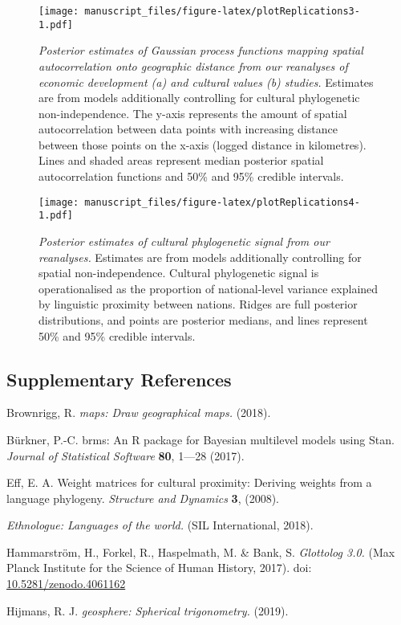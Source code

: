\documentclass[english,man,floatsintext]{apa6}
\begin{document}
\newpage



\begin{figure}
\centering
\texttt{[image: manuscript\_files/figure-latex/plotReplications3-1.pdf]}
\caption{\label{fig:plotReplications3}\emph{Posterior estimates of Gaussian process functions mapping spatial autocorrelation onto geographic distance from our reanalyses of economic development (a) and cultural values (b) studies.} Estimates are from models additionally controlling for cultural phylogenetic non-independence. The y-axis represents the amount of spatial autocorrelation between data points with increasing distance between those points on the x-axis (logged distance in kilometres). Lines and shaded areas represent median posterior spatial autocorrelation functions and 50\% and 95\% credible intervals.}
\end{figure}

\newpage



\begin{figure}
\centering
\texttt{[image: manuscript\_files/figure-latex/plotReplications4-1.pdf]}
\caption{\label{fig:plotReplications4}\emph{Posterior estimates of cultural phylogenetic signal from our reanalyses.} Estimates are from models additionally controlling for spatial non-independence. Cultural phylogenetic signal is operationalised as the proportion of national-level variance explained by linguistic proximity between nations. Ridges are full posterior distributions, and points are posterior medians, and lines represent 50\% and 95\% credible intervals.}
\end{figure}

\newpage

\hypertarget{supplementary-references}{%
\subsection{Supplementary References}\label{supplementary-references}}

Brownrigg, R. \emph{maps: Draw geographical maps.} (2018).

Bürkner, P.-C. brms: An R package for Bayesian multilevel models using Stan. \emph{Journal of Statistical Software} \textbf{80}, 1---28 (2017).

Eff, E. A. Weight matrices for cultural proximity: Deriving weights from a language phylogeny. \emph{Structure and Dynamics} \textbf{3}, (2008).

\emph{Ethnologue: Languages of the world.} (SIL International, 2018).

Hammarström, H., Forkel, R., Haspelmath, M. \& Bank, S. \emph{Glottolog 3.0.} (Max Planck Institute for the Science of Human History, 2017). doi: \href{https://doi.org/10.5281/zenodo.4061162}{10.5281/zenodo.4061162}

Hijmans, R. J. \emph{geosphere: Spherical trigonometry.} (2019).
\end{document}
